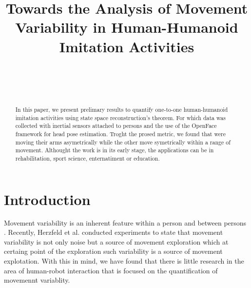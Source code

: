 \documentclass{sigchi}
\def\plaintitle{Towards the Analysis of Movement Variability in Human-Humanoid Imitation Activities}
\def\plainkeywords{Authors' choice; of terms; separated; by
  semicolons; include commas, within terms only; required.}
\begin{document}
\title{\plaintitle}

\author{%
  \\
  \\
  \\
}

\maketitle

\begin{abstract}
  In this paper, we present prelimary results to quantify one-to-one
  human-humanoid imitation activities using state space reconstruction's theorem.
  For which data was collected with inertial sensors attached to persons
  and the use of the OpenFace framework for head pose estimation.
  Troght the prosed metric, we found that were moving their arms
  asymetrically while the other move symetrically within a range of movement.
  Althought the work is in its early stage, the applications can be
  in rehabilitation, sport science, enternatiment or education.
\end{abstract}




\section{Introduction}

Movement variability is an inherent feature within a person and between persons
\cite{newell1993variability}. Recently, Herzfeld et al. \cite{Herzfeld2014}
conducted experiments to state that movement variability is not only noise but a
source of movement exploration which at certaing point of the exploration
such variability is a source of movement explotation.
With this in mind, we have found that there is little research in the area of
human-robot interaction that is focused on the quantification of movemennt variablity.
\end{document}
